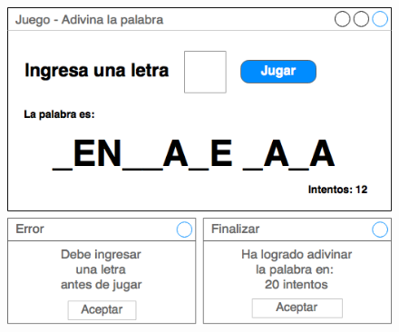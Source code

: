 \documentclass[10pt]{article}
\begin{document}
\begin{enumerate}
        \begin{figure}[H]
        \begin{center}
            \includegraphics[scale=.5]{ejemplo.png}
        \end{center}
        \end{figure}
    
   
    
    
\end{enumerate}
\end{document}
